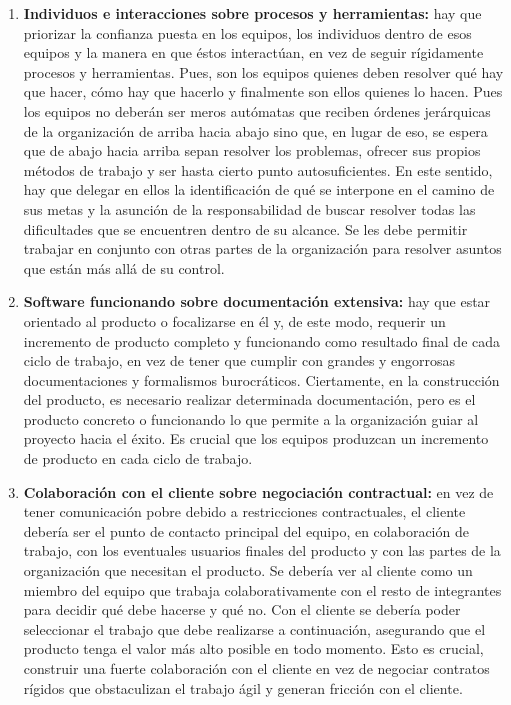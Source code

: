 \begin{enumerate}

\item \textbf{Individuos e interacciones sobre procesos y herramientas:} hay que priorizar la confianza puesta en los equipos, los individuos dentro de esos equipos y la manera en que éstos interactúan, en vez de seguir rígidamente procesos y herramientas. Pues, son los equipos quienes deben resolver qué hay que hacer, cómo hay que hacerlo y finalmente son ellos quienes lo hacen. Pues los equipos no deberán ser meros autómatas que reciben órdenes jerárquicas de la organización de arriba hacia abajo sino que, en lugar de eso, se espera que de abajo hacia arriba sepan resolver los problemas, ofrecer sus propios métodos de trabajo y ser hasta cierto punto autosuficientes. 
En este sentido, hay que delegar en ellos la identificación de qué se interpone en el camino de sus metas y la asunción de la responsabilidad de buscar resolver todas las dificultades que se encuentren dentro de su alcance. Se les debe permitir trabajar en conjunto con otras partes de la organización para resolver asuntos que están más allá de su control.

\item \textbf{Software funcionando sobre documentación extensiva:} hay que estar orientado al producto o focalizarse en él y, de este modo, requerir un incremento de producto completo y funcionando como resultado final de cada ciclo de trabajo, en vez de tener que cumplir con grandes y engorrosas documentaciones y formalismos burocráticos. Ciertamente, en la construcción del producto, es necesario realizar determinada documentación, pero es el producto concreto o funcionando lo que permite a la organización guiar al proyecto hacia el éxito. Es crucial que los equipos produzcan un incremento de producto en cada ciclo de trabajo.

\item \textbf{Colaboración con el cliente sobre negociación contractual:} en vez de tener comunicación pobre debido a restricciones contractuales, el cliente debería ser el punto de contacto principal del equipo, en colaboración de trabajo, con los eventuales usuarios finales del producto y con las partes de la organización que necesitan el producto. Se debería ver al cliente como un miembro del equipo que trabaja colaborativamente con el resto de integrantes para decidir qué debe hacerse y qué no. Con el cliente se debería poder seleccionar el trabajo que debe realizarse a continuación, asegurando que el producto tenga el valor más alto posible en todo momento. Esto es crucial, construir una fuerte colaboración con el cliente en vez de negociar contratos rígidos que obstaculizan el trabajo ágil y generan fricción con el cliente.


\end{enumerate}
